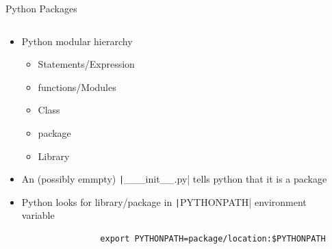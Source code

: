 \documentclass[aspectratio=169]{beamer}
\newcommand{\code}[2][python]{\texttt|#2|}
\begin{document}
\begin{frame}[fragile]{Python Packages}
    \begin{columns}
        \begin{column}{0.52\textwidth}
            \begin{itemize}
                \item Python modular hierarchy
                    \begin{itemize}
                        \item Statements/Expression
                        \item functions/Modules
                        \item Class
                        \item package
                        \item Library
                    \end{itemize}
                \item An (possibly emmpty) \code{___init__.py} tells python that it is a package
                \item Python looks for library/package in \code{PYTHONPATH} environment variable\\
            \begin{verbatim}
                export PYTHONPATH=package/location:$PYTHONPATH
            \end{verbatim}

            \end{itemize}
        \end{column}
        \begin{column}{0.46\textwidth}
        \end{column}
    \end{columns}
\end{frame} 
\end{document}
